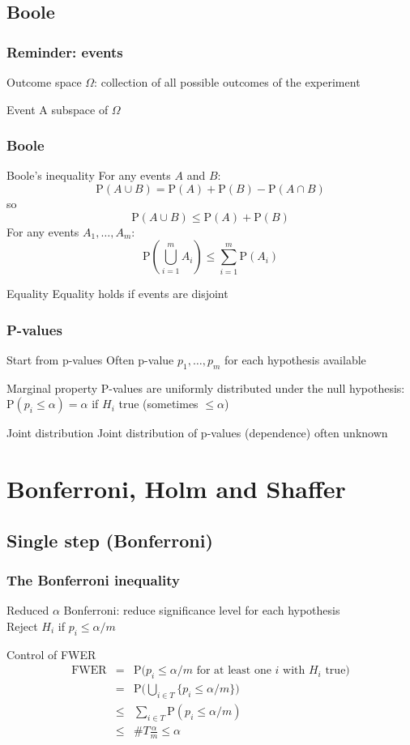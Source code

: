 \documentclass[compress]{beamer}
\newcommand{\bb}[1]{\begin{block}{#1}}
\newcommand{\eb}{\end{block}}
\newcommand{\bfr}[1]{\begin{frame} \frametitle{#1}}
\begin{document}
\subsection{Boole}

\bfr{Reminder: events}
  \bb{Outcome space}
    $\Omega$: collection of all possible outcomes of the experiment
  \eb
  \bb{Event}
    A subspace of $\Omega$
  \eb
  \centering
{}
\end{frame}

\bfr{Boole}
  \bb{Boole's inequality}
    For any events $A$ and $B$:
    \[ \mathrm{P}(A \cup B) = \mathrm{P}(A) + \mathrm{P}(B) - \mathrm{P}(A \cap B) \]
    so
    \[ \mathrm{P}(A \cup B) \leq \mathrm{P}(A) + \mathrm{P}(B) \]
    For any events $A_1, \ldots, A_m$:
    \[ \mathrm{P}(\bigcup_{i=1}^m A_i) \leq \sum_{i=1}^m \mathrm{P}(A_i) \]
  \eb
  \bb{Equality}
    Equality holds if events are disjoint
  \eb
\end{frame}


\bfr{P-values}
  \bb{Start from p-values}
    Often p-value $p_1,\ldots,p_m$ for each hypothesis available
  \eb
  \bb{Marginal property}
    P-values are uniformly distributed under the null hypothesis:\\
    $\mathrm{P}(p_i \leq \alpha) = \alpha$ if $H_i$ true (sometimes $\leq \alpha$)
  \eb
  \bb{Joint distribution}
    Joint distribution of p-values (dependence) often unknown
  \eb
\end{frame}


\section{Bonferroni, Holm and Shaffer}
\subsection{Single step (Bonferroni)}

\bfr{The Bonferroni inequality}
  \bb{Reduced $\alpha$}
    Bonferroni: reduce significance level for each hypothesis
    \\ Reject $H_i$ if $p_i \leq \alpha/m$
  \eb
  \bb{Control of FWER}
    \begin{eqnarray*}
    \mathrm{FWER} &=& \mathrm{P} \big(\textrm{$p_i \leq \alpha/m$ for at least one $i$ with $H_i$ true} \big) \\
    &=& \mathrm{P} \Big( \bigcup_{i\in T} \{p_i \leq \alpha/m\} \Big) \\
    &\leq& \sum_{i \in T} \mathrm{P} (p_i \leq \alpha/m) \\
    &\leq& \#T\frac{\alpha}{m} \leq \alpha
    \end{eqnarray*}
  \eb
\end{frame}
\end{document}
